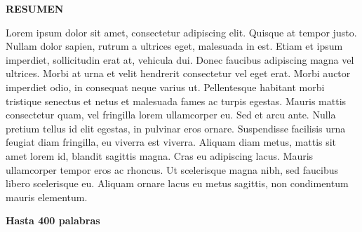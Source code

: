 

\begin{letter}

\begin{center}
{\bfseries \uppercase{\expandafter{Resumen}}}
\end{center}


Lorem ipsum dolor sit amet, consectetur adipiscing elit. Quisque at tempor justo. Nullam dolor sapien, rutrum a ultrices eget, malesuada in est. Etiam et ipsum imperdiet, sollicitudin erat at, vehicula dui. Donec faucibus adipiscing magna vel ultrices. Morbi at urna et velit hendrerit consectetur vel eget erat. Morbi auctor imperdiet odio, in consequat neque varius ut. Pellentesque habitant morbi tristique senectus et netus et malesuada fames ac turpis egestas. Mauris mattis consectetur quam, vel fringilla lorem ullamcorper eu. Sed et arcu ante. Nulla pretium tellus id elit egestas, in pulvinar eros ornare. Suspendisse facilisis urna feugiat diam fringilla, eu viverra est viverra. Aliquam diam metus, mattis sit amet lorem id, blandit sagittis magna. Cras eu adipiscing lacus. Mauris ullamcorper tempor eros ac rhoncus. Ut scelerisque magna nibh, sed faucibus libero scelerisque eu. Aliquam ornare lacus eu metus sagittis, non condimentum mauris elementum.

\begin{center}
{\bf \Large Hasta 400 palabras}
\end{center}

\end{letter}

